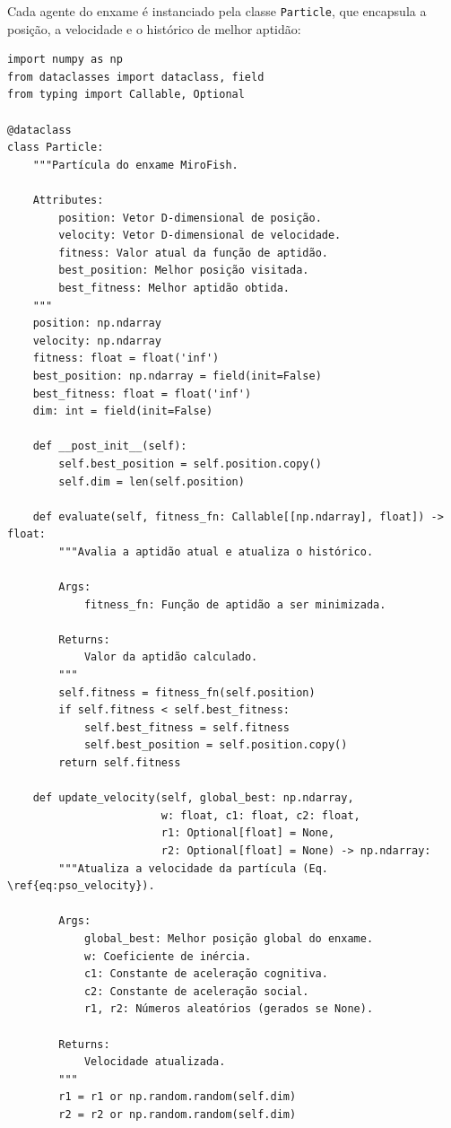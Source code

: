 Cada agente do enxame é instanciado pela classe \texttt{Particle}, que encapsula a posição, a velocidade e o histórico de melhor aptidão:

\begin{lstlisting}[style=pythonstyle, caption=Classe Particle do MiroFish Swarm, label=code:particle]
import numpy as np
from dataclasses import dataclass, field
from typing import Callable, Optional

@dataclass
class Particle:
    """Partícula do enxame MiroFish.
    
    Attributes:
        position: Vetor D-dimensional de posição.
        velocity: Vetor D-dimensional de velocidade.
        fitness: Valor atual da função de aptidão.
        best_position: Melhor posição visitada.
        best_fitness: Melhor aptidão obtida.
    """
    position: np.ndarray
    velocity: np.ndarray
    fitness: float = float('inf')
    best_position: np.ndarray = field(init=False)
    best_fitness: float = float('inf')
    dim: int = field(init=False)
    
    def __post_init__(self):
        self.best_position = self.position.copy()
        self.dim = len(self.position)
    
    def evaluate(self, fitness_fn: Callable[[np.ndarray], float]) -> float:
        """Avalia a aptidão atual e atualiza o histórico.
        
        Args:
            fitness_fn: Função de aptidão a ser minimizada.
        
        Returns:
            Valor da aptidão calculado.
        """
        self.fitness = fitness_fn(self.position)
        if self.fitness < self.best_fitness:
            self.best_fitness = self.fitness
            self.best_position = self.position.copy()
        return self.fitness
    
    def update_velocity(self, global_best: np.ndarray, 
                        w: float, c1: float, c2: float,
                        r1: Optional[float] = None,
                        r2: Optional[float] = None) -> np.ndarray:
        """Atualiza a velocidade da partícula (Eq. \ref{eq:pso_velocity}).
        
        Args:
            global_best: Melhor posição global do enxame.
            w: Coeficiente de inércia.
            c1: Constante de aceleração cognitiva.
            c2: Constante de aceleração social.
            r1, r2: Números aleatórios (gerados se None).
        
        Returns:
            Velocidade atualizada.
        """
        r1 = r1 or np.random.random(self.dim)
        r2 = r2 or np.random.random(self.dim)
        

\end{lstlisting}
